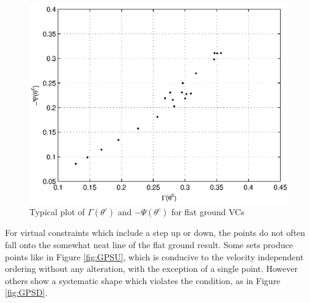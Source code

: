 \begin{figure}
\centering
\includegraphics[width=0.6\linewidth]{7Results/GPFlat}
\caption{Typical plot of $\Gamma(\theta^c)$ and $-\Psi(\theta^c)$ for flat ground VCs}
\label{fig:GPFlat}
\end{figure}

For virtual constraints which include a step up or down, the points do not often fall onto the somewhat neat line of the flat ground result. Some sets produce points like in Figure \ref{fig:GPSU}, which is conducive to the velocity independent ordering without any alteration, with the exception of a single point. However others show a systematic shape which violates the condition, as in Figure \ref{fig:GPSD}.

